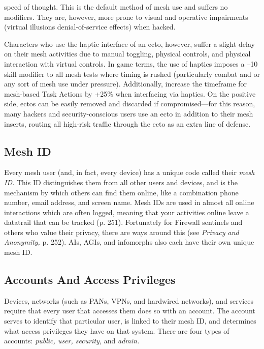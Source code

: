 speed of thought. This is the default method of mesh use and suffers no modifiers. They are, however, more prone to visual and operative impairments (virtual illusions denial-of-service effects) when hacked. 

Characters who use the haptic interface of an ecto, however, suffer a slight delay on their mesh activities due to manual toggling, physical controls, and physical interaction with virtual controls. In game terms, the use of haptics imposes a –10 skill modifier to all mesh tests where timing is rushed (particularly combat and or any sort of mesh use under pressure). Additionally, increase the timeframe for mesh-based Task Actions by +25\% when interfacing via haptics. On the positive side, ectos can be easily removed and discarded if compromised—for this reason, many hackers and security-conscious users use an ecto in addition to their mesh inserts, routing all high-risk traffic through the ecto as an extra line of defense. 

\subsection{Mesh ID} 

Every mesh user (and, in fact, every device) has a unique code called their \textit{mesh ID.} This ID distinguishes them from all other users and devices, and is the mechanism by which others can find them online, like a combination phone number, email address, and screen name. Mesh IDs are used in almost all online interactions which are often logged, meaning that your activities online leave a datatrail that can be tracked (p. 251). Fortunately for Firewall sentinels and others who value their privacy, there are ways around this (see \textit{Privacy and Anonymity,} p. 252). AIs, AGIs, and infomorphs also each have their own unique mesh ID. 

\subsection{Accounts And Access Privileges} 

Devices, networks (such as PANs, VPNs, and hardwired networks), and services require that every user that accesses them does so with an account. The account serves to identify that particular user, is linked to their mesh ID, and determines what access privileges they have on that system. There are four types of accounts: \textit{public, user, security,} and \textit{admin.} 

